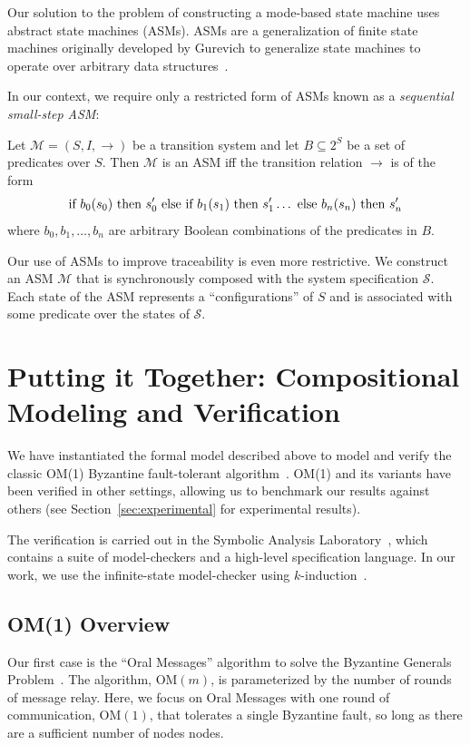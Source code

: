 \documentclass{llncs/llncs}
\newcommand{\OM}[1]{\ensuremath{\mathrm{OM}(#1)}}
\begin{document}
Our solution to the problem of constructing a mode-based state machine uses abstract state machines (ASMs). ASMs are a generalization of finite state machines originally developed by Gurevich to generalize state machines to operate over arbitrary data structures~\cite{asm}.

In our context, we require only a restricted form of ASMs known as a \emph{sequential small-step ASM}:

\begin{definition}
Let $\mathcal{M} = (S, I, \rightarrow)$ be a transition system and let $B \subseteq 2^S$ be a set of predicates over $S$. Then $\mathcal{M}$ is an ASM iff the transition relation $\rightarrow$ is of the form
$$\textnormal{if } b_0(s_0) \textnormal{ then } s'_0 \textnormal{ else if } b_1(s_1) \textnormal{ then } s'_1 \ldots \textnormal{ else } b_n(s_n) \textnormal{ then } s'_n$$
\noindent
where $b_0, b_1, \ldots, b_n$ are arbitrary Boolean combinations of the predicates in $B$.
\end{definition}

Our use of ASMs to improve traceability is even more restrictive. We construct an ASM $\mathcal{M}$ that is synchronously composed with the system specification $\mathcal{S}$. Each state of the ASM represents a ``configurations'' of $S$ and is associated with some predicate over the states of $\mathcal{S}$.


\section{Putting it Together: Compositional Modeling and Verification}\label{sec:byz}

We have instantiated the formal model described above to model and verify the classic OM(1) Byzantine fault-tolerant algorithm~\cite{}. OM(1) and its variants have been verified in other settings, allowing us to benchmark our results against others (see Section~\ref{sec:experimental} for experimental results).

The verification is carried out in the Symbolic Analysis Laboratory~\cite{}, which contains a suite of model-checkers and a high-level specification language. In our work, we use the infinite-state model-checker using $k$-induction~\cite{}.

\subsection{OM(1) Overview}
Our first case is the ``Oral Messages'' algorithm to solve the Byzantine
Generals Problem~\cite{Lamport-OM}. The algorithm, $\OM{m}$, is parameterized by
the number of rounds of message relay. Here, we focus on Oral Messages with one
round of communication, $\OM{1}$, that tolerates a single Byzantine fault, so
long as there are a sufficient number of nodes nodes.
\end{document}

